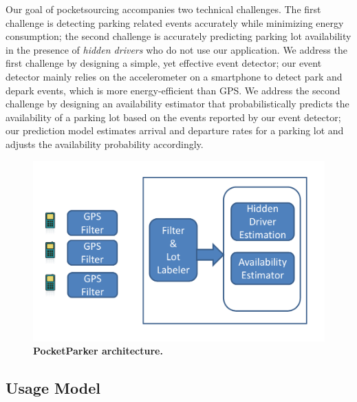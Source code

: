 Our goal of pocketsourcing accompanies two technical challenges. The first
challenge is detecting parking related events accurately while minimizing energy
consumption; the second challenge is accurately predicting parking lot
availability in the presence of {\it hidden drivers} who do not use our
application. We address the first challenge by designing a simple, yet effective
event detector; our event detector mainly relies on the accelerometer on a
smartphone to detect park and depark events, which is more energy-efficient than
GPS. We address the second challenge by designing an availability estimator that
probabilistically predicts the availability of a parking lot based on the events
reported by our event detector; our prediction model estimates arrival and
departure rates for a parking lot and adjusts the availability probability
accordingly.

\begin{figure}
\centering
\includegraphics[width=\columnwidth]{./figures/blockdiagram.pdf}

\caption{\textbf{PocketParker architecture.}}

\label{fig-arch}
\end{figure}

\subsection{Usage Model}
